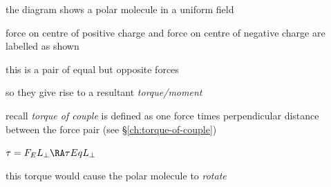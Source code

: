 the diagram shows a polar molecule in a uniform field

force on centre of positive charge and force on centre of negative charge are labelled as shown

this is a pair of equal but opposite forces

so they give rise to a resultant \emph{torque/moment}

recall \emph{torque of couple} is defined as one force times perpendicular distance between the force pair (see \S\ref{ch:torque-of-couple})

{
	\centering
	
	$\tau = F_E L_\perp \RA \tau Eq L_\perp$
	
}

this torque would cause the polar molecule to \emph{rotate}

